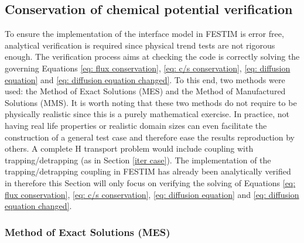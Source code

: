 \subsection{Conservation of chemical potential verification}
To ensure the implementation of the interface model in FESTIM is error free, analytical verification is required since physical trend tests are not rigorous enough. The verification process aims at checking the code is correctly solving the governing Equations \ref{eq: flux conservation}, \ref{eq: c/s conservation}, \ref{eq: diffusion equation} and \ref{eq: diffusion equation changed}.
To this end, two methods were used: the Method of Exact Solutions (MES) and the Method of Manufactured Solutions (MMS).
It is worth noting that these two methods do not require to be physically realistic since this is a purely mathematical exercise.
In practice, not having real life properties or realistic domain sizes can even facilitate the construction of a general test case and therefore ease the results reproduction by others.
A complete H transport problem would include coupling with trapping/detrapping (as in Section \ref{iter case}).
The implementation of the trapping/detrapping coupling in FESTIM has already been analytically verified in  therefore this Section will only focus on verifying the solving of Equations \ref{eq: flux conservation}, \ref{eq: c/s conservation}, \ref{eq: diffusion equation} and \ref{eq: diffusion equation changed}.

\subsubsection{Method of Exact Solutions (MES)}

